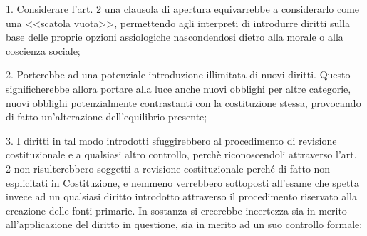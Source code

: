 1. Considerare l'art. 2 una clausola di apertura equivarrebbe a considerarlo come una <<scatola vuota>>, permettendo agli interpreti di introdurre diritti sulla base delle proprie opzioni assiologiche nascondendosi dietro alla morale o alla coscienza sociale;

2. Porterebbe ad una potenziale introduzione illimitata di nuovi diritti. Questo significherebbe allora portare alla luce anche nuovi obblighi per altre categorie, nuovi obblighi potenzialmente contrastanti con la costituzione stessa, provocando di fatto un'alterazione dell'equilibrio presente;

3. I diritti in tal modo introdotti sfuggirebbero al procedimento di revisione costituzionale e a qualsiasi altro controllo, perchè riconoscendoli attraverso l'art. 2 non risulterebbero soggetti a revisione costituzionale perché di fatto non esplicitati in Costituzione, e nemmeno verrebbero sottoposti all'esame che spetta invece ad un qualsiasi diritto introdotto attraverso il procedimento riservato alla creazione delle fonti primarie. In sostanza si creerebbe incertezza sia in merito all'applicazione del diritto in questione, sia in merito ad un suo controllo formale;

